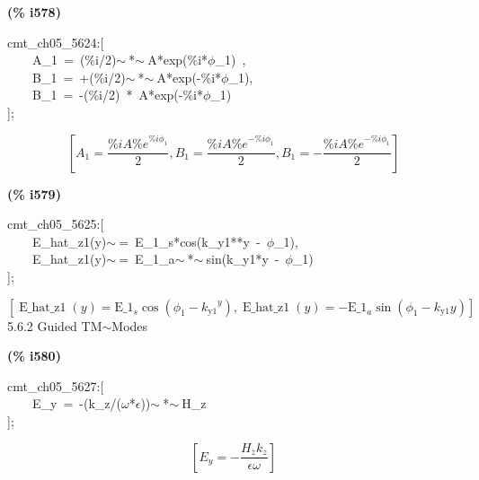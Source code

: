 \documentclass[fleqn]{article}
\begin{document}
\noindent
\begin{minipage}[t]{4.000000em}\color{red}\bfseries
(\% i578)	
\end{minipage}
\begin{minipage}[t]{\textwidth}\color{blue}
cmt\_ch05\_5624:[\\
\ \ \ \ A\_1\ =\ (\%i/2)\ensuremath{\sim\ }*\ensuremath{\sim\ }A*exp(\%i*\ensuremath{\phi}\_1)\ ,\\
\ \ \ \ B\_1\ =\ +(\%i/2)\ensuremath{\sim\ }*\ensuremath{\sim\ }A*exp(-\%i*\ensuremath{\phi}\_1),\\
\ \ \ \ B\_1\ =\ -(\%i/2)\ *\ A*exp(-\%i*\ensuremath{\phi}\_1)\\
];
\end{minipage}
\[\displaystyle \tag{\% o578} 
\left[ {A_1}=\frac{\% i A {{\% e}^{\% i {{\phi }_1}}}}{2}\operatorname{,}{B_1}=\frac{\% i A {{\% e}^{-\% i {{\phi }_1}}}}{2}\operatorname{,}{B_1}=-\frac{\% i A {{\% e}^{-\% i {{\phi }_1}}}}{2}\right] \mbox{}
\]


\noindent
\begin{minipage}[t]{4.000000em}\color{red}\bfseries
(\% i579)	
\end{minipage}
\begin{minipage}[t]{\textwidth}\color{blue}
cmt\_ch05\_5625:[\\
\ \ \ \ E\_hat\_z1(y)\ensuremath{\sim\ }=\ E\_1\_s*cos(k\_y1**y\ -\ \ensuremath{\phi}\_1),\\
\ \ \ \ E\_hat\_z1(y)\ensuremath{\sim\ }=\ E\_1\_a\ensuremath{\sim\ }*\ensuremath{\sim\ }sin(k\_y1*y\ -\ \ensuremath{\phi}\_1)\\
];
\end{minipage}
\[\displaystyle \tag{\% o579} 
\left[ \operatorname{E\_ hat\_ z1}(y)={{\ensuremath{\mathrm{E\_ 1}}}_s} \cos{\left( {{\phi }_1}-{{{k_{\ensuremath{\mathrm{y1}}}}}^{y}}\right) }\operatorname{,}\operatorname{E\_ hat\_ z1}(y)=-{{\ensuremath{\mathrm{E\_ 1}}}_a} \sin{\left( {{\phi }_1}-{k_{\ensuremath{\mathrm{y1}}}} y\right) }\right] \mbox{}
\]
5.6.2   Guided TM\ensuremath{\sim }Modes


\noindent
\begin{minipage}[t]{4.000000em}\color{red}\bfseries
(\% i580)	
\end{minipage}
\begin{minipage}[t]{\textwidth}\color{blue}
cmt\_ch05\_5627:[\\
\ \ \ \ E\_y\ =\ -(k\_z/(\ensuremath{\omega}*\ensuremath{\epsilon}))\ensuremath{\sim\ }*\ensuremath{\sim\ }H\_z\\
];
\end{minipage}
\[\displaystyle \tag{\% o580} 
\left[ {E_y}=-\frac{{H_z} {k_z}}{\epsilon  \omega }\right] \mbox{}
\]
\end{document}
